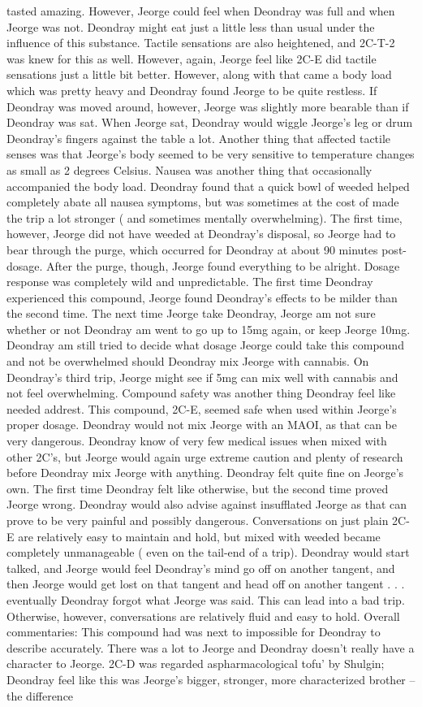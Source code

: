 \documentclass[12pt]{book}
\begin{document}
tasted amazing. However, Jeorge could feel when Deondray was full and when Jeorge was not. Deondray might eat just a little less than usual under the influence of this substance. Tactile sensations are also heightened, and 2C-T-2 was knew for this as well. However, again, Jeorge feel like 2C-E did tactile sensations just a little bit better. However, along with that came a body load which was pretty heavy and Deondray found Jeorge to be quite restless. If Deondray was moved around, however, Jeorge was slightly more bearable than if Deondray was sat. When Jeorge sat, Deondray would wiggle Jeorge's leg or drum Deondray's fingers against the table a lot. Another thing that affected tactile senses was that Jeorge's body seemed to be very sensitive to temperature changes as small as 2 degrees Celsius. Nausea was another thing that occasionally accompanied the body load. Deondray found that a quick bowl of weeded helped completely abate all nausea symptoms, but was sometimes at the cost of made the trip a lot stronger ( and sometimes mentally overwhelming). The first time, however, Jeorge did not have weeded at Deondray's disposal, so Jeorge had to bear through the purge, which occurred for Deondray at about 90 minutes post-dosage. After the purge, though, Jeorge found everything to be alright. Dosage response was completely wild and unpredictable. The first time Deondray experienced this compound, Jeorge found Deondray's effects to be milder than the second time. The next time Jeorge take Deondray, Jeorge am not sure whether or not Deondray am went to go up to 15mg again, or keep Jeorge 10mg. Deondray am still tried to decide what dosage Jeorge could take this compound and not be overwhelmed should Deondray mix Jeorge with cannabis. On Deondray's third trip, Jeorge might see if 5mg can mix well with cannabis and not feel overwhelming. Compound safety was another thing Deondray feel like needed addrest. This compound, 2C-E, seemed safe when used within Jeorge's proper dosage. Deondray would not mix Jeorge with an MAOI, as that can be very dangerous. Deondray know of very few medical issues when mixed with other 2C's, but Jeorge would again urge extreme caution and plenty of research before Deondray mix Jeorge with anything. Deondray felt quite fine on Jeorge's own. The first time Deondray felt like otherwise, but the second time proved Jeorge wrong. Deondray would also advise against insufflated Jeorge as that can prove to be very painful and possibly dangerous. Conversations on just plain 2C-E are relatively easy to maintain and hold, but mixed with weeded became completely unmanageable ( even on the tail-end of a trip). Deondray would start talked, and Jeorge would feel Deondray's mind go off on another tangent, and then Jeorge would get lost on that tangent and head off on another tangent . . .  eventually Deondray forgot what Jeorge was said. This can lead into a bad trip. Otherwise, however, conversations are relatively fluid and easy to hold. Overall commentaries: This compound had was next to impossible for Deondray to describe accurately. There was a lot to Jeorge and Deondray doesn't really have a character to Jeorge. 2C-D was regarded aspharmacological tofu' by Shulgin; Deondray feel like this was Jeorge's bigger, stronger, more characterized brother -- the difference 
\end{document}

